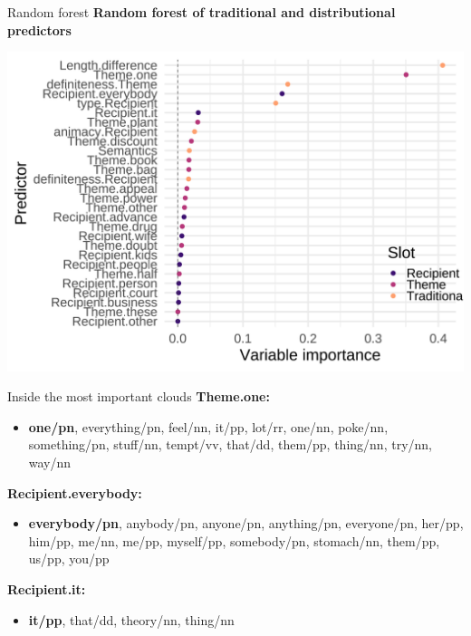 \documentclass[
  ignorenonframetext,
]{beamer}
\providecommand{\tightlist}{%
  \setlength{\itemsep}{0pt}\setlength{\parskip}{0pt}}\usepackage{longtable,booktabs,array}
\begin{document}
\begin{frame}{Random forest}
\protect\hypertarget{random-forest}{}
\textbf{Random forest of traditional and distributional predictors}

\includegraphics{index_files/figure-beamer/rf-full-1.pdf}

\end{frame}

\begin{frame}{Inside the most important clouds}
\protect\hypertarget{inside-the-most-important-clouds}{}
\textbf{Theme.one:}

\begin{itemize}
\tightlist
\item
  \textbf{one/pn}, everything/pn, feel/nn, it/pp, lot/rr, one/nn,
  poke/nn, something/pn, stuff/nn, tempt/vv, that/dd, them/pp, thing/nn,
  try/nn, way/nn
\end{itemize}

\textbf{Recipient.everybody:}

\begin{itemize}
\tightlist
\item
  \textbf{everybody/pn}, anybody/pn, anyone/pn, anything/pn,
  everyone/pn, her/pp, him/pp, me/nn, me/pp, myself/pp, somebody/pn,
  stomach/nn, them/pp, us/pp, you/pp
\end{itemize}

\textbf{Recipient.it:}

\begin{itemize}
\tightlist
\item
  \textbf{it/pp}, that/dd, theory/nn, thing/nn
\end{itemize}
\end{frame}
\end{document}
